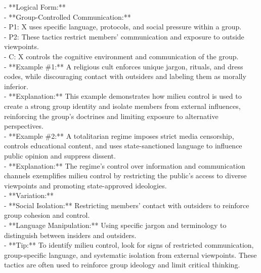 \documentclass[a4paper,12pt,single,pdftex]{scrbook}
\begin{document}
    
      - **Logical Form:**
    \\

    
        - **Group-Controlled Communication:**
    \\

    
          - P1: X uses specific language, protocols, and social pressure within a group.
    \\

    
          - P2: These tactics restrict members' communication and exposure to outside viewpoints.
    \\

    
          - C: X controls the cognitive environment and communication of the group.
    \\

    
      - **Example \#1:** A religious cult enforces unique jargon, rituals, and dress codes, while discouraging contact with outsiders and labeling them as morally inferior.
    \\

    
      - **Explanation:** This example demonstrates how milieu control is used to create a strong group identity and isolate members from external influences, reinforcing the group’s doctrines and limiting exposure to alternative perspectives.
    \\

    
      - **Example \#2:** A totalitarian regime imposes strict media censorship, controls educational content, and uses state-sanctioned language to influence public opinion and suppress dissent.
    \\

    
      - **Explanation:** The regime’s control over information and communication channels exemplifies milieu control by restricting the public’s access to diverse viewpoints and promoting state-approved ideologies.
    \\

    
      - **Variation:**
    \\

    
        - **Social Isolation:** Restricting members' contact with outsiders to reinforce group cohesion and control.
    \\

    
        - **Language Manipulation:** Using specific jargon and terminology to distinguish between insiders and outsiders.
    \\

    
      - **Tip:** To identify milieu control, look for signs of restricted communication, group-specific language, and systematic isolation from external viewpoints. These tactics are often used to reinforce group ideology and limit critical thinking.
    \\
\end{document}
